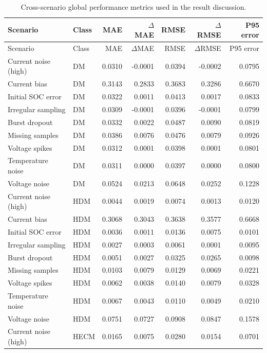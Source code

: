 \documentclass[review]{elsarticle}
\begin{document}
\begin{longtable}{llrrrrr}
\caption{Cross-scenario global performance metrics used in the result discussion.}\label{tab:appendix_key_results}\\
\toprule
Scenario & Class & MAE & $\Delta$MAE & RMSE & $\Delta$RMSE & P95 error \\
\midrule
\endfirsthead
\toprule
Scenario & Class & MAE & $\Delta$MAE & RMSE & $\Delta$RMSE & P95 error \\
\midrule
\endhead
Current noise (high) & DM & 0.0310 & -0.0001 & 0.0394 & -0.0002 & 0.0795 \\
Current bias & DM & 0.3143 & 0.2833 & 0.3683 & 0.3286 & 0.6670 \\
Initial SOC error & DM & 0.0322 & 0.0011 & 0.0413 & 0.0017 & 0.0833 \\
Irregular sampling & DM & 0.0309 & -0.0001 & 0.0396 & -0.0001 & 0.0799 \\
Burst dropout & DM & 0.0332 & 0.0022 & 0.0487 & 0.0090 & 0.0819 \\
Missing samples & DM & 0.0386 & 0.0076 & 0.0476 & 0.0079 & 0.0926 \\
Voltage spikes & DM & 0.0312 & 0.0001 & 0.0398 & 0.0001 & 0.0801 \\
Temperature noise & DM & 0.0311 & 0.0000 & 0.0397 & 0.0000 & 0.0800 \\
Voltage noise & DM & 0.0524 & 0.0213 & 0.0648 & 0.0252 & 0.1228 \\
Current noise (high) & HDM & 0.0044 & 0.0019 & 0.0074 & 0.0013 & 0.0120 \\
Current bias & HDM & 0.3068 & 0.3043 & 0.3638 & 0.3577 & 0.6668 \\
Initial SOC error & HDM & 0.0036 & 0.0011 & 0.0136 & 0.0075 & 0.0101 \\
Irregular sampling & HDM & 0.0027 & 0.0003 & 0.0061 & 0.0001 & 0.0095 \\
Burst dropout & HDM & 0.0051 & 0.0027 & 0.0325 & 0.0265 & 0.0098 \\
Missing samples & HDM & 0.0103 & 0.0079 & 0.0129 & 0.0069 & 0.0221 \\
Voltage spikes & HDM & 0.0062 & 0.0038 & 0.0140 & 0.0079 & 0.0328 \\
Temperature noise & HDM & 0.0067 & 0.0043 & 0.0110 & 0.0049 & 0.0210 \\
Voltage noise & HDM & 0.0751 & 0.0727 & 0.0908 & 0.0847 & 0.1578 \\
Current noise (high) & HECM & 0.0165 & 0.0075 & 0.0280 & 0.0154 & 0.0701 \\

\end{longtable}
\end{document}

